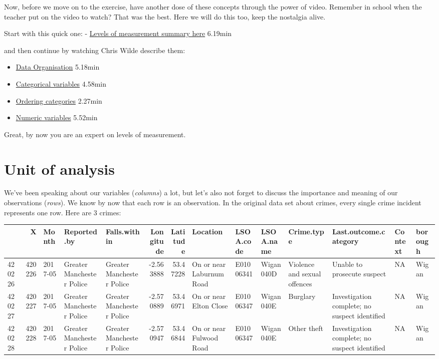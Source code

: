 \documentclass[
]{book}
\providecommand{\tightlist}{%
  \setlength{\itemsep}{0pt}\setlength{\parskip}{0pt}}
\begin{document}
Now, before we move on to the exercise, have another dose of these concepts through the power of video. Remember in school when the teacher put on the video to watch? That was the best. Here we will do this too, keep the nostalgia alive.

Start with this quick one: - \href{https://www.youtube.com/watch?v=hZxnzfnt5v8}{Levels of measurement summary here} 6.19min

and then continue by watching Chris Wilde describe them:

\begin{itemize}
\tightlist
\item
  \href{https://www.youtube.com/watch?v=_ROBwTFVldo\&list=PL8CRAVedURQpYNoFt7w6maxaQCn3ZLytu\&index=3}{Data Organisation} 5.18min
\item
  \href{https://www.youtube.com/watch?v=38oQwFeCEag\&list=PL8CRAVedURQrlxeFfme0TEgaj1_h67JUR\&index=2}{Categorical variables} 4.58min
\item
  \href{https://www.youtube.com/watch?v=xmRuRRHsUeg\&index=3\&list=PL8CRAVedURQrlxeFfme0TEgaj1_h67JUR}{Ordering categories} 2.27min
\item
  \href{https://www.youtube.com/watch?v=U3lk2nQYfAQ\&list=PL8CRAVedURQrlxeFfme0TEgaj1_h67JUR\&index=4}{Numeric variables} 5.52min
\end{itemize}

Great, by now you are an expert on levels of measurement.

\hypertarget{unit-of-analysis}{%
\section{Unit of analysis}\label{unit-of-analysis}}

We've been speaking about our variables (\emph{columns}) a lot, but let's also not forget to discuss the importance and meaning of our observations (\emph{rows}). We know by now that each row is an observation. In the original data set about crimes, every single crime incident represents one row. Here are 3 crimes:

\begin{tabular}{l|r|l|l|l|r|r|l|l|l|l|l|l|l}
\hline
  & X & Month & Reported.by & Falls.within & Longitude & Latitude & Location & LSOA.code & LSOA.name & Crime.type & Last.outcome.category & Context & borough\\
\hline
420226 & 420226 & 2017-05 & Greater Manchester Police & Greater Manchester Police & -2.563888 & 53.47228 & On or near Laburnum Road & E01006341 & Wigan 040D & Violence and sexual offences & Unable to prosecute suspect & NA & Wigan\\
\hline
420227 & 420227 & 2017-05 & Greater Manchester Police & Greater Manchester Police & -2.570889 & 53.46971 & On or near Elton Close & E01006347 & Wigan 040E & Burglary & Investigation complete; no suspect identified & NA & Wigan\\
\hline
420228 & 420228 & 2017-05 & Greater Manchester Police & Greater Manchester Police & -2.570947 & 53.46844 & On or near Fulwood Road & E01006347 & Wigan 040E & Other theft & Investigation complete; no suspect identified & NA & Wigan\\
\hline
\end{tabular}
\end{document}
